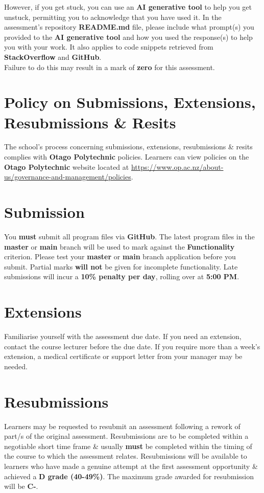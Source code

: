 \documentclass{article}
\begin{document}
 However, if you get stuck, you can use an \textbf{AI generative tool} to help you get unstuck, permitting you to acknowledge that you have used it. In the assessment's repository \textbf{README.md} file, please include what prompt(s) you provided to the \textbf{AI generative tool} and how you used the response(s) to help you with your work. It also applies to code snippets retrieved from \textbf{StackOverflow} and \textbf{GitHub}. \\
 
 Failure to do this may result in a mark of \textbf{zero} for this assessment.

\section*{Policy on Submissions, Extensions, Resubmissions \& Resits}
The school's process concerning submissions, extensions, resubmissions \& resits complies with \textbf{Otago Polytechnic} policies. Learners can view policies on the \textbf{Otago Polytechnic} website located at \href{https://www.op.ac.nz/about-us/governance-and-management/policies}{https://www.op.ac.nz/about-us/governance-and-management/policies}.

\section*{Submission}
You \textbf{must} submit all program files via \textbf{GitHub}. The latest program files in the \textbf{master} or \textbf{main} branch will be used to mark against the \textbf{Functionality} criterion. Please test your \textbf{master} or \textbf{main} branch application before you submit. Partial marks \textbf{will not} be given for incomplete functionality. Late submissions will incur a \textbf{10\% penalty per day}, rolling over at \textbf{5:00 PM}.

\section*{Extensions}
Familiarise yourself with the assessment due date. If you need an extension, contact the course lecturer before the due date. If you require more than a week's extension, a medical certificate or support letter from your manager may be needed.

\section*{Resubmissions}
Learners may be requested to resubmit an assessment following a rework of part/s of the original assessment. Resubmissions are to be completed within a negotiable short time frame \& usually \textbf{must} be completed within the timing of the course to which the assessment relates. Resubmissions will be available to learners who have made a genuine attempt at the first assessment opportunity \& achieved a \textbf{D grade (40-49\%)}. The maximum grade awarded for resubmission will be \textbf{C-}.
\end{document}
